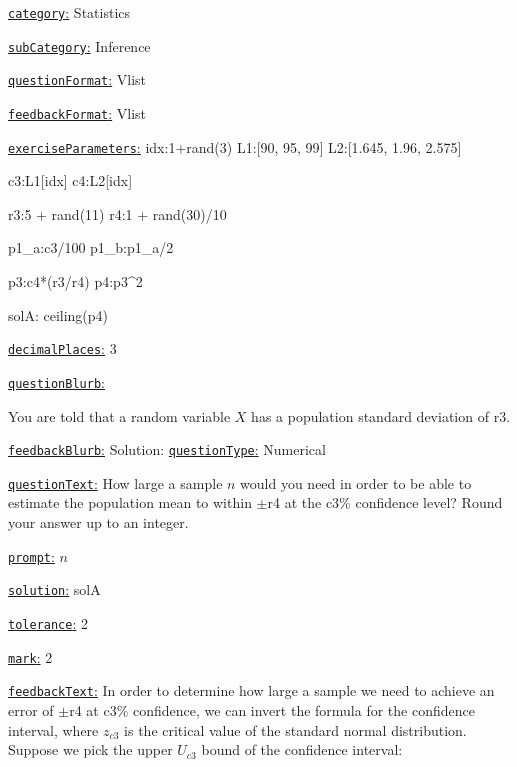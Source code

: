 \documentclass[preview]{standalone}
\newcommand \fieldname[1]{\underline{\texttt{#1}:}}
\begin{document}
\fieldname{category}  %
Statistics

\fieldname{subCategory} %
Inference

\fieldname{questionFormat}
Vlist

\fieldname{feedbackFormat}
Vlist

\fieldname{exerciseParameters}
idx:1+rand(3)
L1:[90, 95, 99]
L2:[1.645, 1.96, 2.575]

c3:L1[idx]
c4:L2[idx]

r3:5 + rand(11)
r4:1 + rand(30)/10

p1_a:c3/100
p1_b:p1_a/2

p3:c4*(r3/r4)
p4:p3^2

solA: ceiling(p4)

\fieldname{decimalPlaces}
3

\fieldname{questionBlurb}

You are told that a random variable $X$ has a population standard deviation of {r3}.


\fieldname{feedbackBlurb}
Solution:
\fieldname{questionType}
Numerical

\fieldname{questionText}
How large a sample $n$ would you need in order to be able to estimate the population mean to within $\pm${r4} at the {c3}\% confidence level? Round your answer up to an integer.

\fieldname{prompt}
$n$

\fieldname{solution}
solA

\fieldname{tolerance}
2

\fieldname{mark}
2

\fieldname{feedbackText}
In order to determine how large a sample we need to achieve an error of $\pm${r4} at {c3}\% confidence, we can invert the formula for the confidence interval, where $z_{{c3}}$ is the critical value of the standard normal distribution. Suppose we pick the upper $U_{{c3}}$ bound of the confidence interval:
\end{document}

